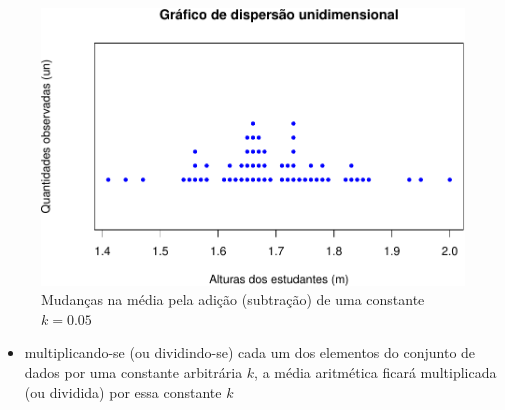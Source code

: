 \documentclass[
]{book}
\providecommand{\tightlist}{%
  \setlength{\itemsep}{0pt}\setlength{\parskip}{0pt}}
\begin{document}
\begin{figure}

{\centering \includegraphics[width=0.8\linewidth]{apostila_files/figure-latex/unnamed-chunk-19-1} 

}

\caption{Mudanças na média pela adição (subtração) de uma constante $k=0.05$}\label{fig:unnamed-chunk-19}
\end{figure}

\hfill\break

\begin{itemize}
\tightlist
\item
  multiplicando-se (ou dividindo-se) cada um dos elementos do conjunto de dados por uma constante arbitrária \(k\), a média aritmética ficará multiplicada (ou dividida) por essa constante \(k\)
\end{itemize}

\hfill\break
\end{document}
